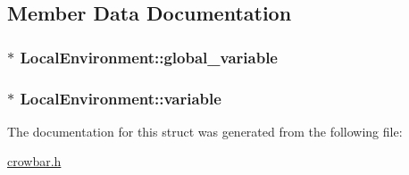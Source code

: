 \subsection{Member Data Documentation}
\hypertarget{struct_local_environment_a4c244dd2fedac828d3db9e42a61772a1}{}
\subsubsection[{global\+\_\+variable}]{$\ast$ Local\+Environment\+::global\+\_\+variable}\label{struct_local_environment_a4c244dd2fedac828d3db9e42a61772a1}
\hypertarget{struct_local_environment_a80c4a3efddd4486c76844fb7f22bca1d}{}
\subsubsection[{variable}]{$\ast$ Local\+Environment\+::variable}\label{struct_local_environment_a80c4a3efddd4486c76844fb7f22bca1d}


The documentation for this struct was generated from the following file\+:\begin{DoxyCompactItemize}
\item 
\hyperlink{crowbar_8h}{crowbar.\+h}\end{DoxyCompactItemize}
